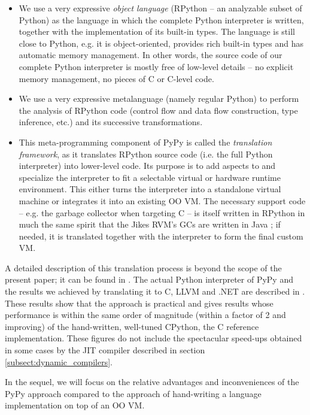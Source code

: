 \documentclass{llncs}
\begin{document}
\begin{itemize}

\item
We use a very expressive \emph{object language} (RPython -- an analyzable
subset of Python) as the language in which the complete Python
interpreter is written, together with the implementation of its
built-in types.  The language is still close to Python, e.g.  it is
object-oriented, provides rich built-in types and has automatic memory
management.  In other words, the source code of our complete Python
interpreter is mostly free of low-level details -- no explicit memory
management, no pieces of C or C-level code.

\item
We use a very expressive metalanguage (namely regular Python) to
perform the analysis of RPython code (control flow and data flow
construction, type inference, etc.) and its successive
transformations.

\item
This meta-programming component of PyPy is called the \emph{translation
framework}, as it translates RPython source code (i.e. the full Python
interpreter) into lower-level code.  Its purpose is to add aspects to
and specialize the interpreter to fit a selectable virtual or hardware
runtime environment.  This either turns the interpreter into a
standalone virtual machine or integrates it into an existing OO VM.
The necessary support code -- e.g. the garbage collector when
targeting C -- is itself written in RPython in much the same spirit
that the Jikes RVM's GCs are written in Java \cite{JikesGC}; if needed, it is
translated together with the interpreter to form the final custom VM.
\end{itemize}

A detailed description of this translation process is beyond the scope of the
present paper; it can be found in \cite{pypyvmconstruction}.  The actual Python
interpreter of PyPy and the results we achieved by translating it to C, LLVM
\cite{LLVM} and .NET are described in \cite{architecture} \cite{translationdoc}.
These results show that the
approach is practical and gives results whose performance is within the same
order of magnitude (within a factor of 2 and improving) of the hand-written,
well-tuned CPython, the C reference implementation.  These figures do not
include the spectacular speed-ups obtained in some cases by the JIT compiler
described in section \ref{subsect:dynamic_compilers}.

In the sequel, we will focus on the relative advantages and
inconveniences of the PyPy approach compared to the approach of
hand-writing a language implementation on top of an OO VM.
\end{document}
